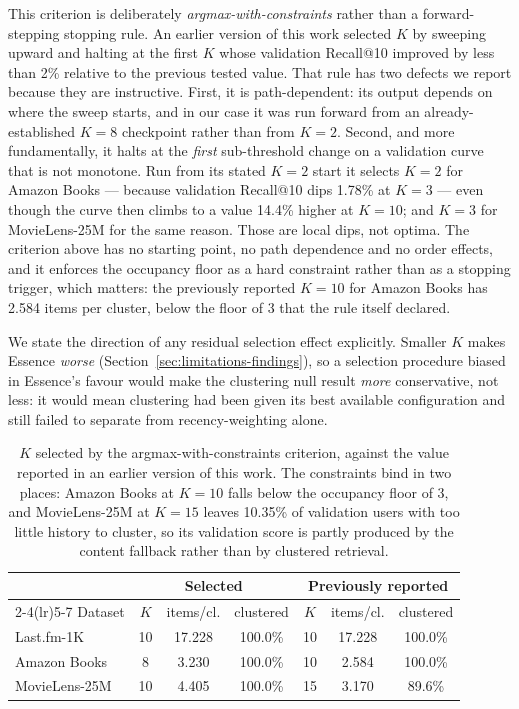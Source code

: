 \documentclass[11pt,a4paper]{article}
\begin{document}
This criterion is deliberately \emph{argmax-with-constraints} rather than
a forward-stepping stopping rule. An earlier version of this work selected
$K$ by sweeping upward and halting at the first $K$ whose validation
Recall@10 improved by less than 2\% relative to the previous tested value.
That rule has two defects we report because they are instructive. First,
it is path-dependent: its output depends on where the sweep starts, and in
our case it was run forward from an already-established $K=8$ checkpoint
rather than from $K=2$. Second, and more fundamentally, it halts at the
\emph{first} sub-threshold change on a validation curve that is not
monotone. Run from its stated $K=2$ start it selects $K=2$ for Amazon
Books --- because validation Recall@10 dips 1.78\% at $K=3$ --- even
though the curve then climbs to a value 14.4\% higher at $K=10$; and
$K=3$ for MovieLens-25M for the same reason. Those are local dips, not
optima. The criterion above has no starting point, no path dependence and
no order effects, and it enforces the occupancy floor as a hard constraint
rather than as a stopping trigger, which matters: the previously reported
$K=10$ for Amazon Books has 2.584 items per cluster, below the floor of 3
that the rule itself declared.

We state the direction of any residual selection effect explicitly.
Smaller $K$ makes Essence \emph{worse} (Section~\ref{sec:limitations-findings}),
so a selection procedure biased in Essence's favour would make the
clustering null result \emph{more} conservative, not less: it would mean
clustering had been given its best available configuration and still
failed to separate from recency-weighting alone.


\begin{table}[t]
\centering
\small
\caption{$K$ selected by the argmax-with-constraints criterion, against the
value reported in an earlier version of this work. The constraints bind in two
places: Amazon Books at $K=10$ falls below the occupancy floor of 3, and
MovieLens-25M at $K=15$ leaves 10.35\% of validation users with too little
history to cluster, so its validation score is partly produced by the content
fallback rather than by clustered retrieval.}
\label{tab:k-selection}
\begin{tabular}{lcccccc}
\toprule
& \multicolumn{3}{c}{\textbf{Selected}} & \multicolumn{3}{c}{\textbf{Previously reported}} \\
\cmidrule(lr){2-4}\cmidrule(lr){5-7}
Dataset & $K$ & items/cl. & clustered & $K$ & items/cl. & clustered \\
\midrule
Last.fm-1K & 10 & 17.228 & 100.0\% & 10 & 17.228 & 100.0\% \\
Amazon Books & 8 & 3.230 & 100.0\% & 10 & 2.584 & 100.0\% \\
MovieLens-25M & 10 & 4.405 & 100.0\% & 15 & 3.170 & 89.6\% \\
\bottomrule
\end{tabular}
\end{table}
\end{document}
